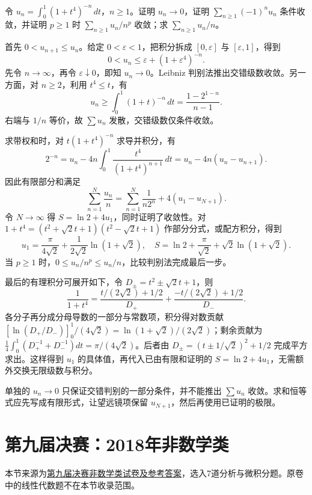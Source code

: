 \documentclass[UTF8,12pt,a4paper,fontset=fandol]{ctexart}
\begin{document}
\begin{example}\label{nm-2020-7}
令 $u_n=\int_0^1(1+t^4)^{-n}\,dt$，$n\geq1$。证明 $u_n\to0$，证明 $\sum_{n\geq1}(-1)^nu_n$ 条件收敛，并证明 $p\geq1$ 时 $\sum_{n\geq1}u_n/n^p$ 收敛；求 $\sum_{n\geq1}u_n/n$。
\end{example}
\begin{solve}
首先 $0<u_{n+1}\leq u_n$。给定 $0<\varepsilon<1$，把积分拆成 $[0,\varepsilon]$ 与 $[\varepsilon,1]$，得到
\[
 0<u_n\leq\varepsilon+(1+\varepsilon^4)^{-n}.
\]
先令 $n\to\infty$，再令 $\varepsilon\downarrow0$，即知 $u_n\to0$。Leibniz 判别法推出交错级数收敛。另一方面，对 $n\geq2$，利用 $t^4\leq t$，有
\[
 u_n\geq\int_0^1(1+t)^{-n}\,dt
 =\frac{1-2^{1-n}}{n-1}.
\]
右端与 $1/n$ 等价，故 $\sum u_n$ 发散，交错级数仅条件收敛。

求带权和时，对 $t(1+t^4)^{-n}$ 求导并积分，有
\[
 2^{-n}=u_n-4n\int_0^1\frac{t^4}{(1+t^4)^{n+1}}\,dt
 =u_n-4n(u_n-u_{n+1}).
\]
因此有限部分和满足
\[
 \sum_{n=1}^N\frac{u_n}{n}
 =\sum_{n=1}^N\frac1{n2^n}+4(u_1-u_{N+1}).
\]
令 $N\to\infty$ 得 $S=\ln2+4u_1$，同时证明了收敛性。对 $1+t^4=(t^2+\sqrt2t+1)(t^2-\sqrt2t+1)$ 作部分分式，或配方积分，得到
\[
 u_1=\frac\pi{4\sqrt2}+\frac1{2\sqrt2}\ln(1+\sqrt2),
 \quad S=\ln2+\frac\pi{\sqrt2}+\sqrt2\ln(1+\sqrt2).
\]
当 $p\geq1$ 时，$0\leq u_n/n^p\leq u_n/n$，比较判别法完成最后一步。

最后的有理积分可展开如下，令 $D_\pm=t^2\pm\sqrt2t+1$，则
\[
\frac1{1+t^4}=
\frac{t/(2\sqrt2)+1/2}{D_+}
+\frac{-t/(2\sqrt2)+1/2}{D_-}.
\]
各分子再分成分母导数的一部分与常数项，积分得对数贡献 $[\ln(D_+/D_-)]_0^1/(4\sqrt2)=\ln(1+\sqrt2)/(2\sqrt2)$；剩余贡献为 $\tfrac14\int_0^1(D_+^{-1}+D_-^{-1})dt=\pi/(4\sqrt2)$。后者由 $D_\pm=(t\pm1/\sqrt2)^2+1/2$ 完成平方求出。这样得到 $u_1$ 的具体值，再代入已由有限和证明的 $S=\ln2+4u_1$，无需额外交换无限级数与积分。

\end{solve}
\begin{remark}
单独的 $u_n\to0$ 只保证交错判别的一部分条件，并不能推出 $\sum u_n$ 收敛。求和恒等式应先写成有限形式，让望远镜项保留 $u_{N+1}$，然后再使用已证明的极限。
\end{remark}

\section{第九届决赛：2018年非数学类}
本节来源为\href{https://math.ecnu.edu.cn/llin/pdf_files/NonMathFinalAns2018.pdf}{第九届决赛非数学类试卷及参考答案}，选入7道分析与微积分题。原卷中的线性代数题不在本节收录范围。
\end{document}
